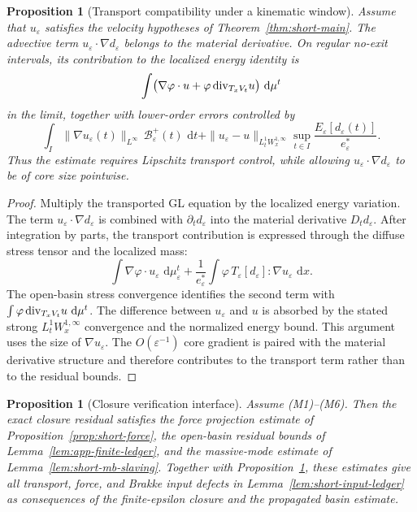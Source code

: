 \documentclass[11pt]{article}
\newtheorem{proposition}[theorem]{Proposition}
\theoremstyle{definition}
\newcommand{\dd}{\,\mathrm d}
\newcommand{\eps}{\varepsilon}
\newcommand{\estar}{e_\varepsilon^\ast}
\newcommand{\Basin}{\mathcal B}
\begin{document}
\begin{proposition}[Transport compatibility under a kinematic window]
\label{prop:transport-compatibility}
Assume that \(u_\eps\) satisfies the velocity hypotheses of
Theorem~\ref{thm:short-main}.  The advective term
\(u_\eps\cdot\nabla d_\eps\) belongs to the material derivative.  On regular
no-exit intervals, its contribution to the localized energy identity is
\[
        \int
        \bigl(\nabla\varphi\cdot u
        +\varphi\,{\rm div}_{T_xV_t}u\bigr)\,\dd\mu^t
\]
in the limit, together with lower-order errors controlled by
\[
        \int_I\|\nabla u_\eps(t)\|_{L^\infty}\,\Basin_\eps^+(t)\,\dd t
        +
        \|u_\eps-u\|_{L^1_tW^{1,\infty}_x}\sup_{t\in I}
        \frac{E_\eps[d_\eps(t)]}{\estar}.
\]
Thus the estimate requires Lipschitz transport control, while allowing
\(u_\eps\cdot\nabla d_\eps\) to be of core size pointwise.
\end{proposition}

\begin{proof}
Multiply the transported GL equation by the localized energy variation.  The
term \(u_\eps\cdot\nabla d_\eps\) is combined with \(\partial_t d_\eps\) into
the material derivative \(D_t d_\eps\).  After integration by parts, the
transport contribution is expressed through the diffuse stress tensor and the
localized mass:
\[
        \int \nabla\varphi\cdot u_\eps\,\dd\mu_\eps^t
        +
        \frac{1}{\estar}
        \int \varphi\, T_\eps[d_\eps]:\nabla u_\eps\,\dd x .
\]
The open-basin stress convergence identifies the second term with
\(\int\varphi\,{\rm div}_{T_xV_t}u\,\dd\mu^t\).  The difference between
\(u_\eps\) and \(u\) is absorbed by the stated strong
\(L^1_tW^{1,\infty}_x\) convergence and the normalized energy bound.  This
argument uses the size of \(\nabla u_\eps\).  The \(O(\eps^{-1})\) core gradient
is paired with the material derivative structure and therefore contributes to
the transport term rather than to the residual bounds.
\end{proof}

\begin{proposition}[Closure verification interface]
\label{prop:verification-interface}
Assume (M1)--(M6).  Then the exact closure residual satisfies the force
projection estimate of Proposition~\ref{prop:short-force}, the open-basin
residual bounds of Lemma~\ref{lem:app-finite-ledger}, and the massive-mode
estimate of Lemma~\ref{lem:short-mb-slaving}.  Together with
Proposition~\ref{prop:transport-compatibility}, these estimates give all
transport, force, and Brakke input defects in
Lemma~\ref{lem:short-input-ledger} as consequences of the finite-epsilon
closure and the propagated basin estimate.
\end{proposition}
\end{document}
